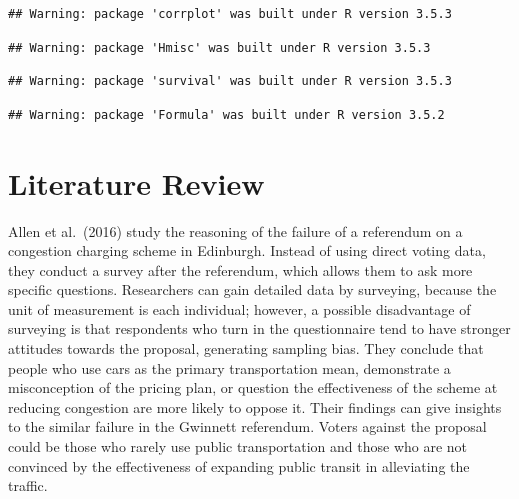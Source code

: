 \documentclass[
]{article}
\begin{document}
\begin{verbatim}
## Warning: package 'corrplot' was built under R version 3.5.3
\end{verbatim}

\begin{verbatim}
## Warning: package 'Hmisc' was built under R version 3.5.3
\end{verbatim}

\begin{verbatim}
## Warning: package 'survival' was built under R version 3.5.3
\end{verbatim}

\begin{verbatim}
## Warning: package 'Formula' was built under R version 3.5.2
\end{verbatim}

\hypertarget{literature-review}{%
\section{Literature Review}\label{literature-review}}

Allen et al.~(2016) study the reasoning of the failure of a referendum
on a congestion charging scheme in Edinburgh. Instead of using direct
voting data, they conduct a survey after the referendum, which allows
them to ask more specific questions. Researchers can gain detailed data
by surveying, because the unit of measurement is each individual;
however, a possible disadvantage of surveying is that respondents who
turn in the questionnaire tend to have stronger attitudes towards the
proposal, generating sampling bias. They conclude that people who use
cars as the primary transportation mean, demonstrate a misconception of
the pricing plan, or question the effectiveness of the scheme at
reducing congestion are more likely to oppose it. Their findings can
give insights to the similar failure in the Gwinnett referendum. Voters
against the proposal could be those who rarely use public transportation
and those who are not convinced by the effectiveness of expanding public
transit in alleviating the traffic.
\end{document}
